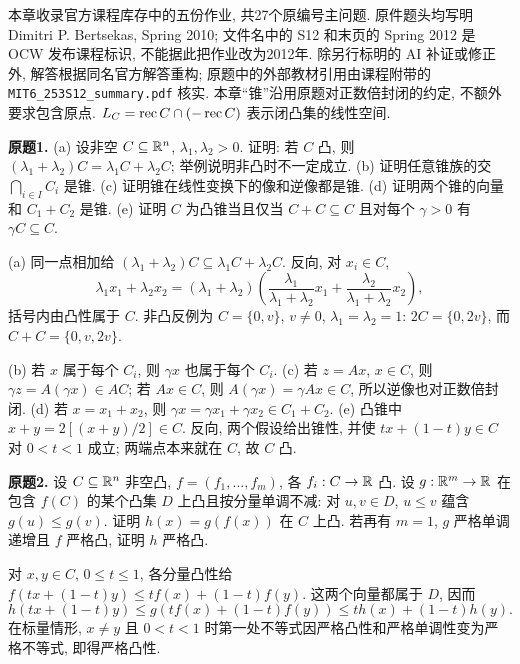 \label{chap:6253-homework}
本章收录官方课程库存中的五份作业, 共27个原编号主问题. 原件题头均写明 Dimitri P. Bertsekas, Spring 2010; 文件名中的 S12 和末页的 Spring 2012 是 OCW 发布课程标识, 不能据此把作业改为2012年. 除另行标明的 AI 补证或修正外, 解答根据同名官方解答重构; 原题中的外部教材引用由课程附带的 \texttt{MIT6\_253S12\_summary.pdf} 核实. 本章“锥”沿用原题对正数倍封闭的约定, 不额外要求包含原点. $L_C=\operatorname{rec} C\cap(-\operatorname{rec} C)$ 表示闭凸集的线性空间.

\begin{exercise}\label{ass:6253-hw1-q1}
\textbf{原题1.} (a) 设非空 $C\subseteq\mathbb R^n$, $\lambda_1,\lambda_2>0$. 证明: 若 $C$ 凸, 则 $(\lambda_1+\lambda_2)C=\lambda_1C+\lambda_2C$; 举例说明非凸时不一定成立.
(b) 证明任意锥族的交 $\bigcap_{i\in I}C_i$ 是锥.
(c) 证明锥在线性变换下的像和逆像都是锥.
(d) 证明两个锥的向量和 $C_1+C_2$ 是锥.
(e) 证明 $C$ 为凸锥当且仅当 $C+C\subseteq C$ 且对每个 $\gamma>0$ 有 $\gamma C\subseteq C$.
\end{exercise}
\begin{solution}
(a) 同一点相加给 $(\lambda_1+\lambda_2)C\subseteq\lambda_1C+\lambda_2C$. 反向, 对 $x_i\in C$,
\[
\lambda_1x_1+\lambda_2x_2=(\lambda_1+\lambda_2)
\left(\frac{\lambda_1}{\lambda_1+\lambda_2}x_1+
\frac{\lambda_2}{\lambda_1+\lambda_2}x_2\right),
\]
括号内由凸性属于 $C$. 非凸反例为 $C=\{0,v\}$, $v\ne0$, $\lambda_1=\lambda_2=1$: $2C=\{0,2v\}$, 而 $C+C=\{0,v,2v\}$.

(b) 若 $x$ 属于每个 $C_i$, 则 $\gamma x$ 也属于每个 $C_i$.
(c) 若 $z=Ax$, $x\in C$, 则 $\gamma z=A(\gamma x)\in AC$; 若 $Ax\in C$, 则 $A(\gamma x)=\gamma Ax\in C$, 所以逆像也对正数倍封闭.
(d) 若 $x=x_1+x_2$, 则 $\gamma x=\gamma x_1+\gamma x_2\in C_1+C_2$.
(e) 凸锥中 $x+y=2[(x+y)/2]\in C$. 反向, 两个假设给出锥性, 并使 $tx+(1-t)y\in C$ 对 $0<t<1$ 成立; 两端点本来就在 $C$, 故 $C$ 凸.
\end{solution}

\begin{exercise}\label{ass:6253-hw1-q2}
\textbf{原题2.} 设 $C\subseteq\mathbb R^n$ 非空凸, $f=(f_1,\ldots,f_m)$, 各 $f_i:C\to\mathbb R$ 凸. 设 $g:\mathbb R^m\to\mathbb R$ 在包含 $f(C)$ 的某个凸集 $D$ 上凸且按分量单调不减: 对 $u,v\in D$, $u\le v$ 蕴含 $g(u)\le g(v)$. 证明 $h(x)=g(f(x))$ 在 $C$ 上凸. 若再有 $m=1$, $g$ 严格单调递增且 $f$ 严格凸, 证明 $h$ 严格凸.
\end{exercise}
\begin{solution}
对 $x,y\in C$, $0\le t\le1$, 各分量凸性给 $f(tx+(1-t)y)\le tf(x)+(1-t)f(y)$. 这两个向量都属于 $D$, 因而
\[
h(tx+(1-t)y)\le g(tf(x)+(1-t)f(y))
\le th(x)+(1-t)h(y).
\]
在标量情形, $x\ne y$ 且 $0<t<1$ 时第一处不等式因严格凸性和严格单调性变为严格不等式, 即得严格凸性.
\end{solution}

